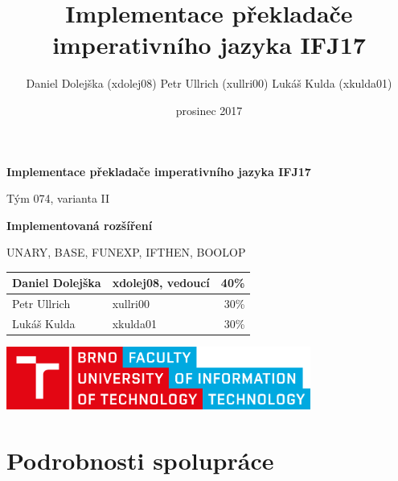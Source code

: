 \documentclass[a4paper,11pt]{article}
\title{Implementace překladače imperativního jazyka IFJ17}
\author{
	Daniel Dolejška (xdolej08)
	\newline
	Petr Ullrich (xullri00)
	\newline
	Lukáš Kulda (xkulda01)
}
\date{prosinec 2017}
\begin{document}
\begin{titlepage}
	\centering
	
	{
		\huge
		\textbf{Implementace překladače imperativního jazyka IFJ17}
	}

	\vspace{1cm}
	
	Tým 074, varianta II
	
	\vspace{0.25cm}
	
	{
		\large\textbf{Implementovaná rozšíření}
		
		\textsf{UNARY},
		\textsf{BASE},
		\textsf{FUNEXP},
		\textsf{IFTHEN},
		\textsf{BOOLOP}
	}
	
	\vfill
	
	\renewcommand{\arraystretch}{1.2}
	\begin{tabular}{ l l r }
		\hline
		Daniel Dolejška	& \textsf{xdolej08}, vedoucí	& 40\% \\ \hline
		Petr Ullrich	& \textsf{xullri00}				& 30\% \\ \hline
		Lukáš Kulda		& \textsf{xkulda01}				& 30\% \\
		\hline
	\end{tabular}

	\vspace{2cm}

	\includegraphics[width=10cm]{VUT-FIT-logo.pdf}
	
\end{titlepage}


\newpage

\tableofcontents

\vspace{2cm}
\listoffigures


\newpage
\section{Podrobnosti spolupráce} \label{podrobnosti}
\end{document}
